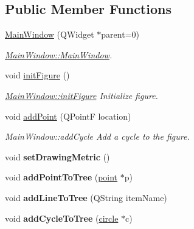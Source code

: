 \subsection*{Public Member Functions}
\begin{DoxyCompactItemize}
\item 
\mbox{\hyperlink{class_main_window_a8b244be8b7b7db1b08de2a2acb9409db}{Main\+Window}} (Q\+Widget $\ast$parent=0)
\begin{DoxyCompactList}\small\item\em \mbox{\hyperlink{class_main_window_a8b244be8b7b7db1b08de2a2acb9409db}{Main\+Window\+::\+Main\+Window}}. \end{DoxyCompactList}\item 
void \mbox{\hyperlink{class_main_window_ad0adb1cd734f6bba159f13fd332d62f5}{init\+Figure}} ()
\begin{DoxyCompactList}\small\item\em \mbox{\hyperlink{class_main_window_ad0adb1cd734f6bba159f13fd332d62f5}{Main\+Window\+::init\+Figure}} Initialize figure. \end{DoxyCompactList}\item 
void \mbox{\hyperlink{class_main_window_aa33398d6788bcd727486b5fff5c238e4}{add\+Point}} (Q\+PointF location)
\begin{DoxyCompactList}\small\item\em Main\+Window\+::add\+Cycle Add a cycle to the figure. \end{DoxyCompactList}\item 
\mbox{\label{class_main_window_af7d2eb4ee3fb3cc4f0b83deffdb81ae8}} 
void {\bfseries set\+Drawing\+Metric} ()
\item 
\mbox{\label{class_main_window_a40346d328146b3a78cb08a400c53a47e}} 
void {\bfseries add\+Point\+To\+Tree} (\mbox{\hyperlink{classpoint}{point}} $\ast$p)
\item 
\mbox{\label{class_main_window_ad322f29d75b06348ee43ce911a1cc36f}} 
void {\bfseries add\+Line\+To\+Tree} (Q\+String item\+Name)
\item 
\mbox{\label{class_main_window_aac80f9ac141e25d2fae5ae71ba762142}} 
void {\bfseries add\+Cycle\+To\+Tree} (\mbox{\hyperlink{classcircle}{circle}} $\ast$c)
\item 
\mbox{\label{class_main_window_ac993682874f221dbe0e82c7118d05684}} 

\end{DoxyCompactItemize}
